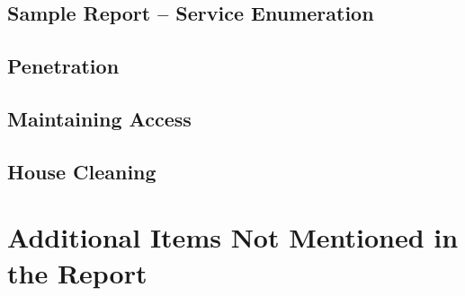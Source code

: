 \documentclass[a4paper]{article}
\begin{document}
            \subsection{Sample Report – Service Enumeration}
            \subsection{Penetration}
            \subsection{Maintaining Access}
            \subsection{House Cleaning}
    \section{Additional Items Not Mentioned in the Report}
\end{document}
